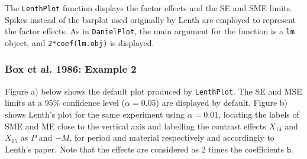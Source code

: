 \documentclass[letterpaper]{article}
\begin{document}
The \texttt{LenthPlot} function displays the factor effects and the SE and
SME limits. Spikes instead of the barplot used originally by Lenth are
employed to represent the factor effects. As in \texttt{DanielPlot}, the main
argument for the function is a \texttt{lm} object, and
\texttt{2*coef(lm.obj)} is displayed.

\subsubsection{Box et al. 1986: Example 2}

Figure a) below shows the default plot produced by \texttt{LenthPlot}. The SE
and MSE limits at a 95\% confidence level ($\alpha=0.05$) are displayed by
default. Figure b) shows Lenth's plot for the same experiment using
$\alpha=0.01$, locating the labels of SME and ME close to the vertical axis
and labelling the contrast effects $X_{14}$ and $X_{15}$ as $P$ and $-M$, for
period and material respectively and accordingly to Lenth's paper. Note that
the effects are considered as 2 times the coefficients $\texttt{b}$.
\end{document}
